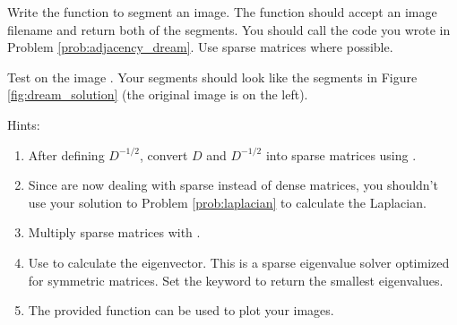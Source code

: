 \begin{problem} Write the function  to segment an image.
The function should accept an image filename and return both of the segments.
You should call the code you wrote in Problem \ref{prob:adjacency_dream}.
Use sparse matrices where possible.


Test on the image .
Your segments should look like the segments in Figure \ref{fig:dream_solution} (the original image is on the left). 

Hints:
\begin{enumerate}
\item After defining $D^{-1/2}$, convert $D$ and $D^{-1/2}$ into sparse matrices using .
\item Since are now dealing with sparse instead of dense matrices, you shouldn't use your solution to Problem \ref{prob:laplacian} to calculate the Laplacian. 

\item Multiply sparse matrices with .

\item Use  to calculate the eigenvector. This is a sparse eigenvalue solver optimized for symmetric matrices.
Set the keyword  to return the smallest eigenvalues.

\item The provided function  can be used to plot your images. 

\end{enumerate}

\end{problem}

